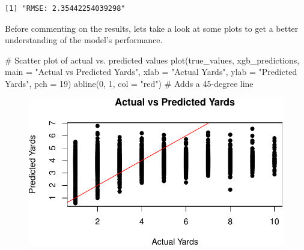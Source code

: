\documentclass[
  super,
  preprint,
  3p]{elsarticle}
\newenvironment{Shaded}{\begin{snugshade}}{\end{snugshade}}
\newcommand{\AttributeTok}[1]{\textcolor[rgb]{0.40,0.45,0.13}{#1}}
\newcommand{\CommentTok}[1]{\textcolor[rgb]{0.37,0.37,0.37}{#1}}
\newcommand{\DecValTok}[1]{\textcolor[rgb]{0.68,0.00,0.00}{#1}}
\newcommand{\FunctionTok}[1]{\textcolor[rgb]{0.28,0.35,0.67}{#1}}
\newcommand{\NormalTok}[1]{\textcolor[rgb]{0.00,0.23,0.31}{#1}}
\newcommand{\OtherTok}[1]{\textcolor[rgb]{0.00,0.23,0.31}{#1}}
\newcommand{\SpecialCharTok}[1]{\textcolor[rgb]{0.37,0.37,0.37}{#1}}
\newcommand{\StringTok}[1]{\textcolor[rgb]{0.13,0.47,0.30}{#1}}
\begin{document}
\begin{Shaded}
\end{Shaded}

\begin{verbatim}
[1] "RMSE: 2.35442254039298"
\end{verbatim}

Before commenting on the results, lets take a look at some plots to get
a better understanding of the model's performance.

\begin{Shaded}
\begin{Highlighting}[]
\CommentTok{\# Scatter plot of actual vs. predicted values}
\FunctionTok{plot}\NormalTok{(true\_values, xgb\_predictions, }\AttributeTok{main =} \StringTok{"Actual vs Predicted Yards"}\NormalTok{, }\AttributeTok{xlab =} \StringTok{"Actual Yards"}\NormalTok{, }\AttributeTok{ylab =} \StringTok{"Predicted Yards"}\NormalTok{, }\AttributeTok{pch =} \DecValTok{19}\NormalTok{)}
\FunctionTok{abline}\NormalTok{(}\DecValTok{0}\NormalTok{, }\DecValTok{1}\NormalTok{, }\AttributeTok{col =} \StringTok{"red"}\NormalTok{)  }\CommentTok{\# Adds a 45{-}degree line}
\end{Highlighting}
\end{Shaded}

\begin{figure}[H]

{\centering \includegraphics{project_report_files/figure-pdf/unnamed-chunk-27-1.pdf}

}

\end{figure}
\end{document}
